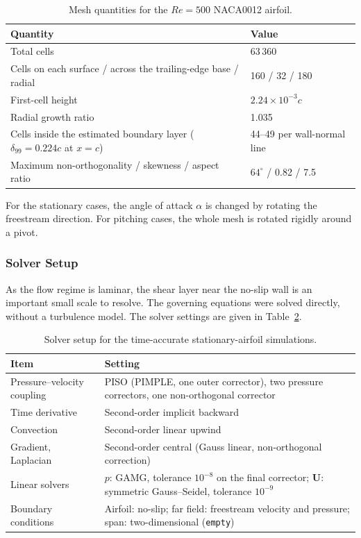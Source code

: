 \begin{table}[htbp]\centering\small
\caption{Mesh quantities for the $Re=500$ NACA0012 airfoil.}\label{tab:mesh}
\begin{tabularx}{\linewidth}{@{}>{\raggedright\arraybackslash}p{.57\linewidth}X@{}}
\toprule Quantity & Value \\
\midrule
Total cells & 63\,360 \\
Cells on each surface / across the trailing-edge base / radial & 160 / 32 / 180 \\
First-cell height & $2.24\times10^{-3}c$ \\
Radial growth ratio & 1.035 \\
Cells inside the estimated boundary layer ($\delta_{99}=0.224c$ at $x=c$) & 44--49 per wall-normal line \\
Maximum non-orthogonality / skewness / aspect ratio & $64^\circ$ / 0.82 / 7.5 \\
\bottomrule
\end{tabularx}
\end{table}

For the stationary cases, the angle of attack $\alpha$ is changed by rotating the freestream direction. For pitching cases, the whole mesh is rotated rigidly around a pivot.

\subsubsection{Solver Setup}
As the flow regime is laminar, the shear layer near the no-slip wall is an important small scale to resolve. The governing equations were solved directly, without a turbulence model. The solver settings are given in Table~\ref{tab:static_solver}.

\begin{table}[htbp]\centering\small
\caption{Solver setup for the time-accurate stationary-airfoil simulations.}\label{tab:static_solver}
\begin{tabularx}{\linewidth}{@{}>{\raggedright\arraybackslash}p{.28\linewidth}X@{}}
\toprule Item & Setting \\
\midrule
Pressure--velocity coupling & PISO (PIMPLE, one outer corrector), two pressure correctors, one non-orthogonal corrector \\
Time derivative & Second-order implicit backward \\
Convection & Second-order linear upwind \\
Gradient, Laplacian & Second-order central (Gauss linear, non-orthogonal correction) \\
Linear solvers & $p$: GAMG, tolerance $10^{-8}$ on the final corrector; $\mathbf{U}$: symmetric Gauss--Seidel, tolerance $10^{-9}$ \\
Boundary conditions & Airfoil: no-slip; far field: freestream velocity and pressure; span: two-dimensional (\texttt{empty}) \\
\bottomrule
\end{tabularx}
\end{table}

